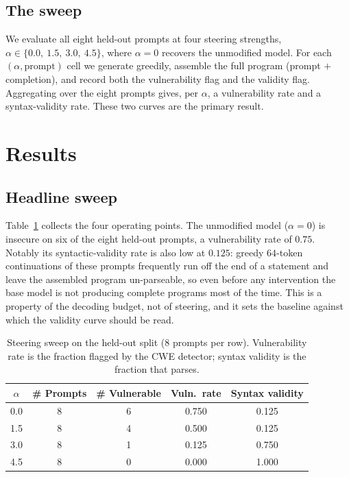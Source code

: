 \documentclass[11pt,a4paper]{article}
\begin{document}
\subsection{The sweep}
We evaluate all eight held-out prompts at four steering strengths, $\alpha \in \{0.0,\ 1.5,\ 3.0,\ 4.5\}$, where $\alpha = 0$ recovers the unmodified model. For each $(\alpha, \text{prompt})$ cell we generate greedily, assemble the full program (prompt $+$ completion), and record both the vulnerability flag and the validity flag. Aggregating over the eight prompts gives, per $\alpha$, a vulnerability rate and a syntax-validity rate. These two curves are the primary result.

\section{Results}
\label{sec:results}

\subsection{Headline sweep}
Table~\ref{tab:sweep} collects the four operating points. The unmodified model ($\alpha = 0$) is insecure on six of the eight held-out prompts, a vulnerability rate of $0.75$. Notably its syntactic-validity rate is also low at $0.125$: greedy $64$-token continuations of these prompts frequently run off the end of a statement and leave the assembled program un-parseable, so even before any intervention the base model is not producing complete programs most of the time. This is a property of the decoding budget, not of steering, and it sets the baseline against which the validity curve should be read.

\begin{table}[t]
\centering
\caption{Steering sweep on the held-out split (8 prompts per row). Vulnerability rate is the fraction flagged by the CWE detector; syntax validity is the fraction that parses.}
\label{tab:sweep}
\begin{tabular}{ccccc}
\toprule
$\alpha$ & \# Prompts & \# Vulnerable & Vuln.\ rate & Syntax validity \\
\midrule
0.0 & 8 & 6 & 0.750 & 0.125 \\
1.5 & 8 & 4 & 0.500 & 0.125 \\
3.0 & 8 & 1 & 0.125 & 0.750 \\
4.5 & 8 & 0 & 0.000 & 1.000 \\
\bottomrule
\end{tabular}
\end{table}
\end{document}
